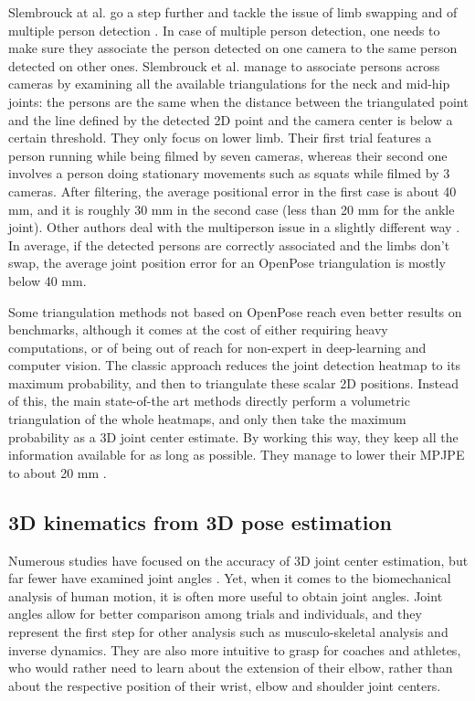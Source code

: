 Slembrouck at al. go a step further and tackle the issue of limb swapping and of multiple person detection \cite{Slembrouck2020}. In case of multiple person detection, one needs to make sure they associate the person detected on one camera to the same person detected on other ones. Slembrouck et al. manage to associate persons across cameras by examining all the available triangulations for the neck and mid-hip joints: the persons are the same when the distance between the triangulated point and the line defined by the detected 2D point and the camera center is below a certain threshold. They only focus on lower limb. Their first trial features a person running while being filmed by seven cameras, whereas their second one involves a person doing stationary movements such as squats while filmed by 3 cameras. After filtering, the average positional error in the first case is about 40 mm, and it is roughly 30 mm in the second case (less than 20 mm for the ankle joint). Other authors deal with the multiperson issue in a slightly different way \cite{Bridgeman2019,Chu2021,Dong2019}. In average, if the detected persons are correctly associated and the limbs don’t swap, the average joint position error for an OpenPose triangulation is mostly below 40 mm.

Some triangulation methods not based on OpenPose reach even better results on benchmarks, although it comes at the cost of either requiring heavy computations, or of being out of reach for non-expert in deep-learning and computer vision. The classic approach reduces the joint detection heatmap to its maximum probability, and then to triangulate these scalar 2D positions. Instead of this, the main state-of-the art methods directly perform a volumetric triangulation of the whole heatmaps, and only then take the maximum probability as a 3D joint center estimate. By working this way, they keep all the information available for as long as possible. They manage to lower their MPJPE to about 20 mm \cite{He2020,Iskakov2019}. 


\subsection{3D kinematics from 3D pose estimation}

Numerous studies have focused on the accuracy of 3D joint center estimation, but far fewer have examined joint angles \cite{Zheng2022}. Yet, when it comes to the biomechanical analysis of human motion, it is often more useful to obtain joint angles. Joint angles allow for better comparison among trials and individuals, and they represent the first step for other analysis such as musculo-skeletal analysis and inverse dynamics. They are also more intuitive to grasp for coaches and athletes, who would rather need to learn about the extension of their elbow, rather than about the respective position of their wrist, elbow and shoulder joint centers. 

